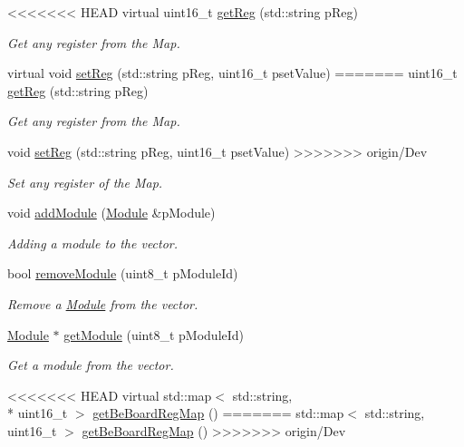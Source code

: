 \begin{DoxyCompactItemize}
<<<<<<< HEAD
virtual uint16\-\_\-t \hyperlink{class_ph2___hw_description_1_1_be_board_ac25f4182e6340ca29d42ba9b861d8e67}{get\-Reg} (std\-::string p\-Reg)
\begin{DoxyCompactList}\small\item\em Get any register from the Map. \end{DoxyCompactList}\item 
virtual void \hyperlink{class_ph2___hw_description_1_1_be_board_a933f9d5f715fbe9187f6aa79589cb55c}{set\-Reg} (std\-::string p\-Reg, uint16\-\_\-t pset\-Value)
=======
uint16\-\_\-t \hyperlink{class_ph2___hw_description_1_1_be_board_ac25f4182e6340ca29d42ba9b861d8e67}{get\-Reg} (std\-::string p\-Reg)
\begin{DoxyCompactList}\small\item\em Get any register from the Map. \end{DoxyCompactList}\item 
void \hyperlink{class_ph2___hw_description_1_1_be_board_a933f9d5f715fbe9187f6aa79589cb55c}{set\-Reg} (std\-::string p\-Reg, uint16\-\_\-t pset\-Value)
>>>>>>> origin/Dev
\begin{DoxyCompactList}\small\item\em Set any register of the Map. \end{DoxyCompactList}\item 
void \hyperlink{class_ph2___hw_description_1_1_be_board_a5242925c065165be9b407dabf889ac9a}{add\-Module} (\hyperlink{class_ph2___hw_description_1_1_module}{Module} \&p\-Module)
\begin{DoxyCompactList}\small\item\em Adding a module to the vector. \end{DoxyCompactList}\item 
bool \hyperlink{class_ph2___hw_description_1_1_be_board_aba02e7319c8c41b569c583bfa2068215}{remove\-Module} (uint8\-\_\-t p\-Module\-Id)
\begin{DoxyCompactList}\small\item\em Remove a \hyperlink{class_ph2___hw_description_1_1_module}{Module} from the vector. \end{DoxyCompactList}\item 
\hyperlink{class_ph2___hw_description_1_1_module}{Module} $\ast$ \hyperlink{class_ph2___hw_description_1_1_be_board_a71b8e3e970d554d7642bea8a9d21b037}{get\-Module} (uint8\-\_\-t p\-Module\-Id)
\begin{DoxyCompactList}\small\item\em Get a module from the vector. \end{DoxyCompactList}\item 
<<<<<<< HEAD
virtual std\-::map$<$ std\-::string, \\*
uint16\-\_\-t $>$ \hyperlink{class_ph2___hw_description_1_1_be_board_a8d27a8030371768636694f5b2ac95046}{get\-Be\-Board\-Reg\-Map} ()
=======
std\-::map$<$ std\-::string, uint16\-\_\-t $>$ \hyperlink{class_ph2___hw_description_1_1_be_board_aff2710580b471a4209c240310cf23ba6}{get\-Be\-Board\-Reg\-Map} ()
>>>>>>> origin/Dev
\end{DoxyCompactItemize}

